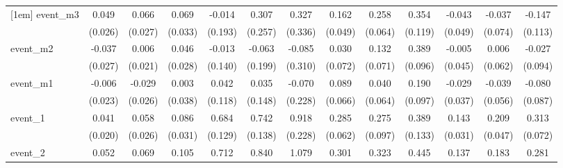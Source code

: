 {\begin{tabular}{l*{12}{c}}
[1em]
event\_m3    &       0.049         &       0.066\sym{*}  &       0.069\sym{*}  &      -0.014         &       0.307         &       0.327         &       0.162\sym{**} &       0.258\sym{***}&       0.354\sym{**} &      -0.043         &      -0.037         &      -0.147         \\
            &     (0.026)         &     (0.027)         &     (0.033)         &     (0.193)         &     (0.257)         &     (0.336)         &     (0.049)         &     (0.064)         &     (0.119)         &     (0.049)         &     (0.074)         &     (0.113)         \\
[1em]
event\_m2    &      -0.037         &       0.006         &       0.046         &      -0.013         &      -0.063         &      -0.085         &       0.030         &       0.132         &       0.389\sym{***}&      -0.005         &       0.006         &      -0.027         \\
            &     (0.027)         &     (0.021)         &     (0.028)         &     (0.140)         &     (0.199)         &     (0.310)         &     (0.072)         &     (0.071)         &     (0.096)         &     (0.045)         &     (0.062)         &     (0.094)         \\
[1em]
event\_m1    &      -0.006         &      -0.029         &       0.003         &       0.042         &       0.035         &      -0.070         &       0.089         &       0.040         &       0.190         &      -0.029         &      -0.039         &      -0.080         \\
            &     (0.023)         &     (0.026)         &     (0.038)         &     (0.118)         &     (0.148)         &     (0.228)         &     (0.066)         &     (0.064)         &     (0.097)         &     (0.037)         &     (0.056)         &     (0.087)         \\
[1em]
event\_1     &       0.041\sym{*}  &       0.058\sym{*}  &       0.086\sym{**} &       0.684\sym{***}&       0.742\sym{***}&       0.918\sym{***}&       0.285\sym{***}&       0.275\sym{**} &       0.389\sym{**} &       0.143\sym{***}&       0.209\sym{***}&       0.313\sym{***}\\
            &     (0.020)         &     (0.026)         &     (0.031)         &     (0.129)         &     (0.138)         &     (0.228)         &     (0.062)         &     (0.097)         &     (0.133)         &     (0.031)         &     (0.047)         &     (0.072)         \\
[1em]
event\_2     &       0.052\sym{*}  &       0.069\sym{*}  &       0.105\sym{**} &       0.712\sym{***}&       0.840\sym{***}&       1.079\sym{***}&       0.301\sym{***}&       0.323\sym{**} &       0.445\sym{*}  &       0.137\sym{***}&       0.183\sym{***}&       0.281\sym{***}\\

\end{tabular}}
